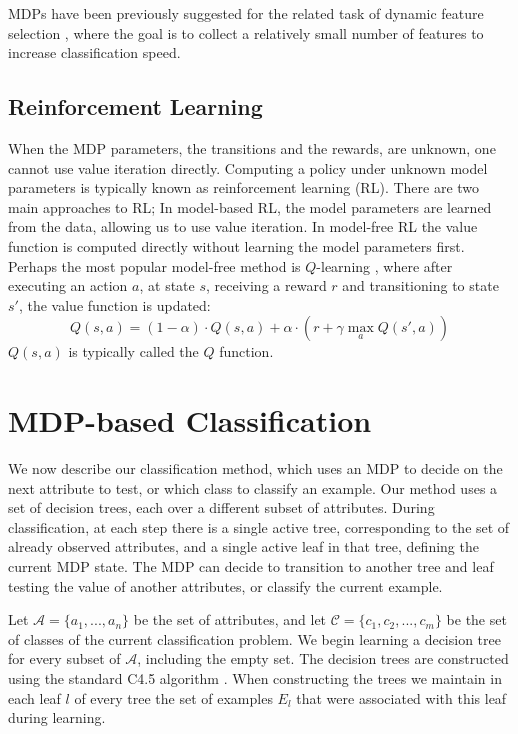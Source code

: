 \documentclass[letterpaper]{article}
\theoremstyle{definition}
\begin{document}
MDPs have been previously suggested for the related task of dynamic feature selection \cite{he2012cost}, where the goal is to collect a relatively small number of features to increase classification speed.

\subsection{Reinforcement Learning}

When the MDP parameters, the transitions and the rewards, are unknown, one cannot use value iteration directly. Computing a policy under unknown model parameters is typically known as reinforcement learning (RL)\cite{sutton1998reinforcement}. There are two main approaches to RL; In model-based RL, the model parameters are learned from the data, allowing us to use value iteration. In model-free RL the value function is computed directly without learning the model parameters first. Perhaps the most popular model-free method is $Q$-learning \cite{watkins1992q}, where after executing an action $a$, at state $s$, receiving a reward $r$ and transitioning to state $s'$, the value function is updated:
\begin{equation}
Q(s,a) = (1-\alpha) \cdot Q(s,a) + \alpha \cdot (r + \gamma \max_a Q(s',a))
\end{equation}
$Q(s,a)$ is typically called the $Q$ function.


\section{MDP-based Classification}

We now describe our classification method, which uses an MDP to decide on the next attribute to test, or which class to classify an example. Our method uses a set of decision trees, each over a different subset of attributes. During classification, at each step there is a single active tree, corresponding to the set of already observed attributes, and a single active leaf in that tree, defining the current MDP state. The MDP can decide to transition to another tree and leaf  testing the value of another attributes, or classify the current example.

Let $\mathcal{A} = \{a_1,...,a_n\}$ be the set of attributes, and let $\mathcal{C} = \{c_1,c_2,...,c_m\}$ be the set of classes of the current classification problem. We begin  learning a decision tree for every subset of $\mathcal{A}$, including the empty set. The decision trees are constructed using the standard C4.5 algorithm \cite{quinlan2014c4}. When constructing the trees we maintain in each leaf $l$ of every tree the set of examples $E_l$ that were associated with this leaf during learning.
\end{document}
